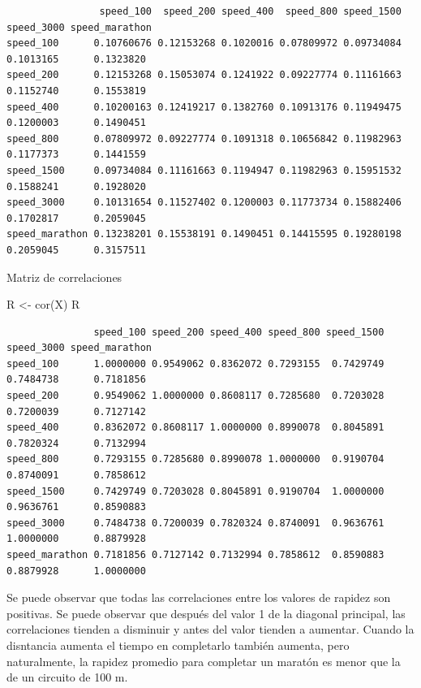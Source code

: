 \documentclass[
]{article}
\newenvironment{Shaded}{\begin{snugshade}}{\end{snugshade}}
\newcommand{\FunctionTok}[1]{\textcolor[rgb]{0.00,0.00,0.00}{#1}}
\newcommand{\NormalTok}[1]{#1}
\newcommand{\OtherTok}[1]{\textcolor[rgb]{0.56,0.35,0.01}{#1}}
\begin{document}
\begin{verbatim}
                speed_100  speed_200 speed_400  speed_800 speed_1500 speed_3000 speed_marathon
speed_100      0.10760676 0.12153268 0.1020016 0.07809972 0.09734084  0.1013165      0.1323820
speed_200      0.12153268 0.15053074 0.1241922 0.09227774 0.11161663  0.1152740      0.1553819
speed_400      0.10200163 0.12419217 0.1382760 0.10913176 0.11949475  0.1200003      0.1490451
speed_800      0.07809972 0.09227774 0.1091318 0.10656842 0.11982963  0.1177373      0.1441559
speed_1500     0.09734084 0.11161663 0.1194947 0.11982963 0.15951532  0.1588241      0.1928020
speed_3000     0.10131654 0.11527402 0.1200003 0.11773734 0.15882406  0.1702817      0.2059045
speed_marathon 0.13238201 0.15538191 0.1490451 0.14415595 0.19280198  0.2059045      0.3157511
\end{verbatim}

Matriz de correlaciones

\begin{Shaded}
\begin{Highlighting}[]
\NormalTok{R }\OtherTok{\textless{}{-}} \FunctionTok{cor}\NormalTok{(X)}
\NormalTok{R}
\end{Highlighting}
\end{Shaded}

\begin{verbatim}
               speed_100 speed_200 speed_400 speed_800 speed_1500 speed_3000 speed_marathon
speed_100      1.0000000 0.9549062 0.8362072 0.7293155  0.7429749  0.7484738      0.7181856
speed_200      0.9549062 1.0000000 0.8608117 0.7285680  0.7203028  0.7200039      0.7127142
speed_400      0.8362072 0.8608117 1.0000000 0.8990078  0.8045891  0.7820324      0.7132994
speed_800      0.7293155 0.7285680 0.8990078 1.0000000  0.9190704  0.8740091      0.7858612
speed_1500     0.7429749 0.7203028 0.8045891 0.9190704  1.0000000  0.9636761      0.8590883
speed_3000     0.7484738 0.7200039 0.7820324 0.8740091  0.9636761  1.0000000      0.8879928
speed_marathon 0.7181856 0.7127142 0.7132994 0.7858612  0.8590883  0.8879928      1.0000000
\end{verbatim}

Se puede observar que todas las correlaciones entre los valores de
rapidez son positivas. Se puede observar que después del valor 1 de la
diagonal principal, las correlaciones tienden a disminuir y antes del
valor tienden a aumentar. Cuando la disntancia aumenta el tiempo en
completarlo también aumenta, pero naturalmente, la rapidez promedio para
completar un maratón es menor que la de un circuito de 100 m.
\end{document}
